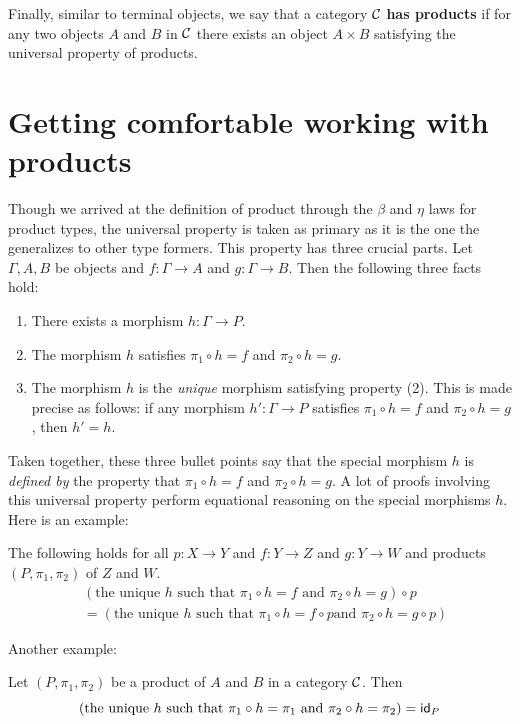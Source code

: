 Finally, similar to terminal objects, we say that a category $\mathcal C$ \textbf{has
products} if for any two objects $A$ and $B$ in $\mathcal C$ there exists an 
object $A \times B$ satisfying the universal property of products.

\section{Getting comfortable working with products}

Though we arrived at the definition of product through the \(\beta\)
and \(\eta\) laws for product types,
the universal property is taken as primary
as it is the one the generalizes to other type formers.
This property has three crucial parts.
Let \(\Gamma,A,B\) be objects and \(f : \Gamma \to A\)
and \(g : \Gamma \to B\). Then the following three facts hold:
\begin{enumerate}
\item There exists a morphism \(h : \Gamma \to P\).
\item The morphism \(h\) satisfies \(\pi_1 \circ h = f\) and \(\pi_2 \circ h = g\).
\item The morphism \(h\) is the \emph{unique} morphism satisfying property (2).
  This is made precise as follows:
  if any morphism \(h' : \Gamma \to P\) satisfies \(\pi_1 \circ h = f\)
  and \(\pi_2 \circ h = g\), then \(h' = h\).
\end{enumerate}
Taken together, these three bullet points say that
the special morphism \(h\) is \emph{defined by}
the property that \(\pi_1 \circ h = f\) and \(\pi_2 \circ h = g\).
A lot of proofs involving this universal property
perform equational reasoning
on the special morphisms \(h\).
Here is an example:
\begin{proposition} \label{prop:tupling-nat}
  The following holds for all \(p : X \to Y\)
  and \(f : Y \to Z\) and \(g : Y \to W\)
  and products \((P,\pi_1,\pi_2)\) of \(Z\) and \(W\).
  \begin{align*}
  &(\text{the unique \(h\) such that \(\pi_1\circ h = f\) and \(\pi_2 \circ h = g\)})
  \circ p
  \\
  &= (\text{the unique \(h\) such that \(\pi_1 \circ h = f \circ p\)
  and \(\pi_2 \circ h = g \circ p\)})
  \end{align*}
\end{proposition}
Another example:
\begin{proposition}
  Let \((P,\pi_1,\pi_2)\) be a product of \(A\) and \(B\)
  in a category \(\mathcal C\).
  Then
  \[
  (\text{the unique \(h\) such that \(\pi_1\circ h = \pi_1\)
  and \(\pi_2 \circ h = \pi_2\)})
  = \mathsf{id}_{P}
  \]
\end{proposition}
